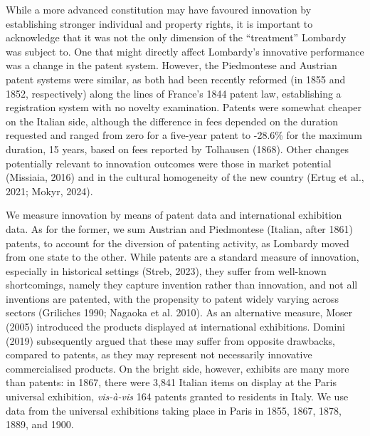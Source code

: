While a more advanced constitution may have favoured innovation by establishing stronger individual and property rights, it is important to acknowledge that it was not the only dimension of the ``treatment'' Lombardy was subject to. One that might directly affect Lombardy's innovative performance was a change in the patent system. However, the Piedmontese and Austrian patent systems were similar, as both had been recently reformed (in 1855 and 1852, respectively) along the lines of France's 1844 patent law, establishing a registration system with no novelty examination. Patents were somewhat cheaper on the Italian side, although the difference in fees depended on the duration requested and ranged from zero for a five-year patent to -28.6\% for the maximum duration, 15 years, based on fees reported by Tolhausen (1868). 
Other changes potentially relevant to innovation outcomes were those in market potential (Missiaia, 2016) %
and in the cultural homogeneity of the new country (Ertug et al., 2021; Mokyr, 2024). %

We measure innovation by means of patent data and international exhibition data. As for the former, we sum Austrian and Piedmontese (Italian, after 1861) patents, to account for the diversion of patenting activity, as Lombardy moved from one state to the other. While patents are a standard measure of innovation, especially in historical settings (Streb, 2023), they suffer from well-known shortcomings, namely they capture invention rather than innovation, and not all inventions are patented, with the propensity to patent widely varying across sectors (Griliches 1990; Nagaoka et al. 2010). As an alternative measure, Moser (2005) introduced the products displayed at international exhibitions. Domini (2019) subsequently argued that these may suffer from opposite drawbacks, compared to patents, as they may represent not necessarily innovative commercialised products. On the bright side, however, exhibits are many more than patents: in 1867, there were 3,841 Italian items on display at the Paris universal exhibition, \textit{vis-à-vis} 164 patents granted to residents in Italy. We use data from the universal exhibitions taking place in Paris in 1855, 1867, 1878, 1889, and 1900. %


